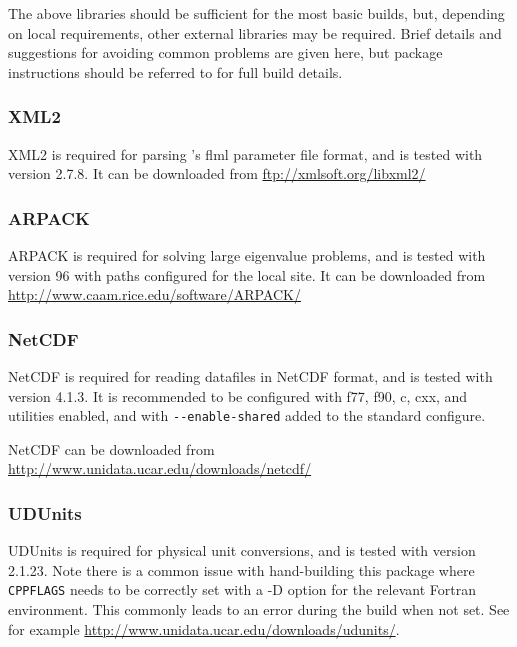 The above libraries should be sufficient for the most basic \fluidity builds,
but, depending on local requirements, other external libraries may be required.
Brief details and suggestions for avoiding common problems are given here, but
package instructions should be referred to for full build details.

\subsubsection{XML2}
\label{sec:required_libraries_supporting_xml2}

XML2 is required for parsing \fluidity's flml parameter file format, and is
tested with version 2.7.8. It can be downloaded from \url{ftp://xmlsoft.org/libxml2/}

\subsubsection{ARPACK}
\label{sec:required_libraries_supporting_arpack}

ARPACK is required for solving large eigenvalue problems, and is tested with
version 96 with paths configured for the local site. It can be downloaded from
\url{http://www.caam.rice.edu/software/ARPACK/}

\subsubsection{NetCDF}
\label{sec:required_libraries_supporting_netcdf}

NetCDF is required for reading datafiles in NetCDF format, and is tested with
version 4.1.3. It is recommended to be configured with f77, f90, c, cxx, and
utilities enabled, and with \lstinline[language=bash]+--enable-shared+ added to
the standard configure. 

NetCDF can be downloaded from \url{http://www.unidata.ucar.edu/downloads/netcdf/}

\subsubsection{UDUnits}
\label{sec:required_libraries_supporting_udunits}

UDUnits is required for physical unit conversions, and is tested with version
2.1.23. Note there is a common issue with hand-building this package where
\lstinline[language=bash]+CPPFLAGS+ needs to be correctly set with a -D
option for the relevant Fortran environment. This commonly leads to an error
during the build when not set. See for example
\url{http://www.unidata.ucar.edu/downloads/udunits/}.

